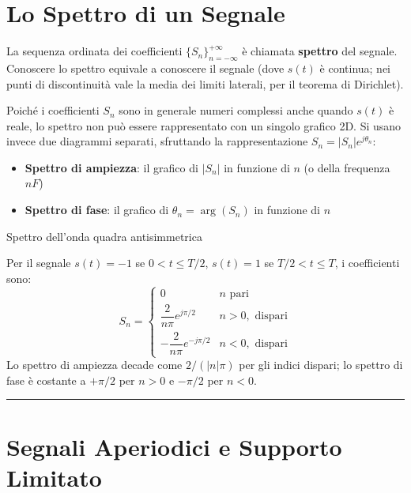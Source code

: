 \documentclass[
  italian,
  openany]{book}
\providecommand{\tightlist}{%
  \setlength{\itemsep}{0pt}\setlength{\parskip}{0pt}}
\begin{document}
\section{Lo Spettro di un Segnale}\label{lo-spettro-di-un-segnale}

La sequenza ordinata dei coefficienti \(\{S_n\}_{n=-\infty}^{+\infty}\)
è chiamata \textbf{spettro} del segnale. Conoscere lo spettro equivale a
conoscere il segnale (dove \(s(t)\) è continua; nei punti di
discontinuità vale la media dei limiti laterali, per il teorema di
Dirichlet).

Poiché i coefficienti \(S_n\) sono in generale numeri complessi anche
quando \(s(t)\) è reale, lo spettro non può essere rappresentato con un
singolo grafico 2D. Si usano invece due diagrammi separati, sfruttando
la rappresentazione \(S_n = |S_n| e^{j\theta_n}\):

\begin{itemize}
\tightlist
\item
  \textbf{Spettro di ampiezza}: il grafico di \(|S_n|\) in funzione di
  \(n\) (o della frequenza \(nF\))
\item
  \textbf{Spettro di fase}: il grafico di \(\theta_n = \arg(S_n)\) in
  funzione di \(n\)
\end{itemize}

\begin{callouttip}{Spettro dell’onda quadra antisimmetrica}

Per il segnale \(s(t) = -1\) se \(0 < t \le T/2\), \(s(t) = 1\) se
\(T/2 < t \le T\), i coefficienti sono:
\[S_n = \begin{cases} 0 & n \text{ pari} \\ \dfrac{2}{n\pi} e^{j\pi/2} & n > 0, \text{ dispari} \\ -\dfrac{2}{n\pi} e^{-j\pi/2} & n < 0, \text{ dispari} \end{cases}\]
Lo spettro di ampiezza decade come \(2/(|n|\pi)\) per gli indici
dispari; lo spettro di fase è costante a \(+\pi/2\) per \(n > 0\) e
\(-\pi/2\) per \(n < 0\).

\end{callouttip}

\begin{center}\rule{0.5\linewidth}{0.5pt}\end{center}

\section{Segnali Aperiodici e Supporto
Limitato}\label{segnali-aperiodici-e-supporto-limitato}
\end{document}
